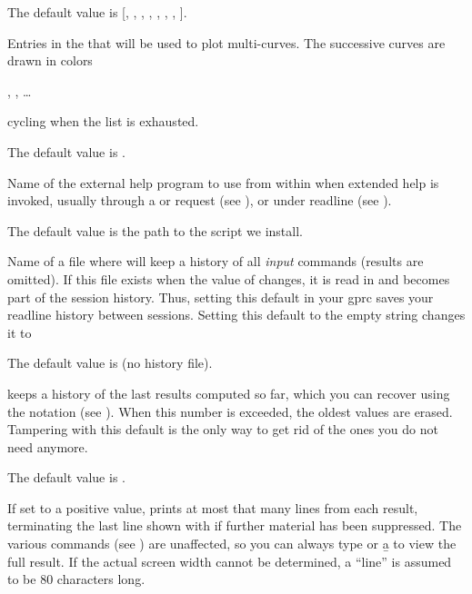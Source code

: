 {The default value is [, , ,
, , , ,
].

\label{se:def,graphcolors}
Entries in the
 that will be used to plot multi-curves. The successive
curves are drawn in colors

, ,
  \dots

cycling when the  list is exhausted.

The default value is \kbd{[4,5]}.

\label{se:def,help}
Name of the external help program to use from within  when
extended help is invoked, usually through a  or  request
(see ), or  under readline (see
).

The default value is the path to the  script we install.

\label{se:def,histfile}
Name of a file where
 will keep a history of all \emph{input} commands (results are
omitted). If this file exists when the value of  changes,
it is read in and becomes part of the session history. Thus, setting this
default in your gprc saves your readline history between sessions. Setting
this default to the empty string  changes it to

The default value is  (no history file).

\label{se:def,histsize}
 keeps a history of the last
 results computed so far, which you can recover using the
\kbd{\%} notation (see ). When this number is exceeded,
the oldest values are erased. Tampering with this default is the only way to
get rid of the ones you do not need anymore.

The default value is .

\label{se:def,lines}
If set to a positive value,  prints at
most that many lines from each result, terminating the last line shown with
\kbd{[+++]} if further material has been suppressed. The various 
commands (see ) are unaffected, so you can always type
 or \b{a} to view the full result. If the actual screen width
cannot be determined, a ``line'' is assumed to be 80 characters long.

}
